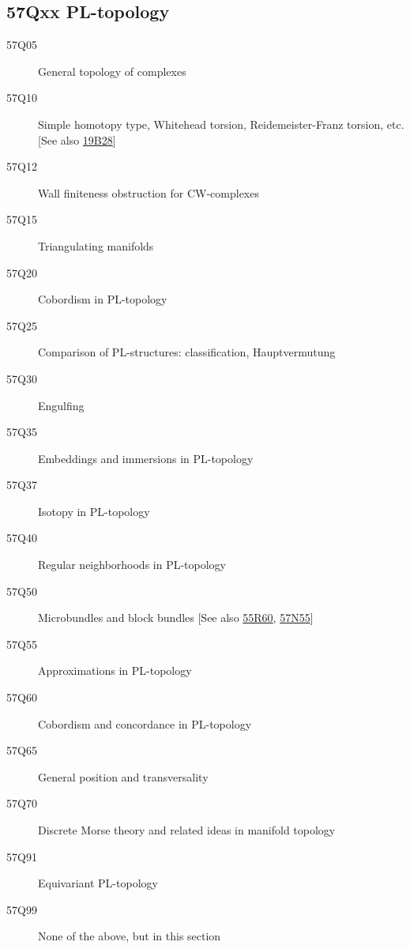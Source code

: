 \documentclass[letterpaper]{article}
\begin{document}
\subsection*{57Qxx  PL-topology }\label{57Qxx}
\begin{description}  
\item [57Q05]\label{57Q05} General topology of complexes
\item [57Q10]\label{57Q10} Simple homotopy type, Whitehead torsion, Reidemeister-Franz torsion, etc. [See also \hyperref[19B28]{19B28}]
\item [57Q12]\label{57Q12} Wall finiteness obstruction for CW-complexes
\item [57Q15]\label{57Q15} Triangulating manifolds
\item [57Q20]\label{57Q20} Cobordism in PL-topology
\item [57Q25]\label{57Q25} Comparison of PL-structures: classification, Hauptvermutung
\item [57Q30]\label{57Q30} Engulfing 
\item [57Q35]\label{57Q35} Embeddings and immersions  in PL-topology
\item [57Q37]\label{57Q37} Isotopy  in PL-topology
\item [57Q40]\label{57Q40} Regular neighborhoods  in PL-topology
\item [57Q50]\label{57Q50} Microbundles and block bundles [See also \hyperref[55R60]{55R60}, \hyperref[57N55]{57N55}]
\item [57Q55]\label{57Q55} Approximations  in PL-topology
\item [57Q60]\label{57Q60} Cobordism and concordance  in PL-topology
\item [57Q65]\label{57Q65} General position and transversality
\item [57Q70]\label{57Q70} Discrete Morse theory and related ideas in manifold topology
\item [57Q91]\label{57Q91} Equivariant PL-topology
\item [57Q99]\label{57Q99} None of the above, but in this section
\end{description}
\end{document}

